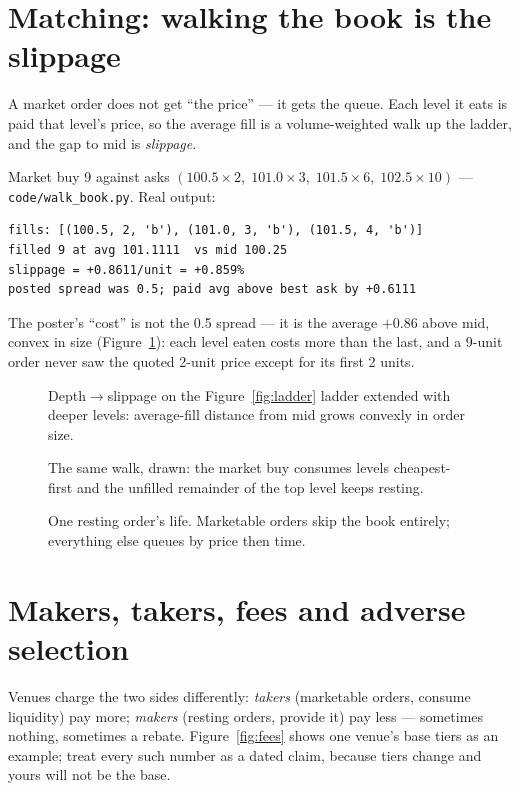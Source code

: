 \section{Matching: walking the book is the slippage}\label{sec:match}
A market order does not get ``the price'' --- it gets the queue.
Each level it eats is paid that level's price, so the average fill
is a volume-weighted walk up the ladder, and the gap to mid is
\emph{slippage}.

\begin{example}\label{ex:walk}
Market buy 9 against asks $(100.5\!\times\!2,\;101.0\!\times\!3,\;
101.5\!\times\!6,\;102.5\!\times\!10)$ ---
\texttt{code/walk\_book.py}. Real output:
\begin{lstlisting}[numbers=none]
fills: [(100.5, 2, 'b'), (101.0, 3, 'b'), (101.5, 4, 'b')]
filled 9 at avg 101.1111  vs mid 100.25
slippage = +0.8611/unit = +0.859%
posted spread was 0.5; paid avg above best ask by +0.6111
\end{lstlisting}
The poster's ``cost'' is not the 0.5 spread --- it is the average
$+0.86$ above mid, convex in size (Figure~\ref{fig:slip}): each
level eaten costs more than the last, and a 9-unit order never saw
the quoted 2-unit price except for its first 2 units.
\end{example}

\begin{figure}[ht]\centering

\caption{Depth$\to$slippage on the Figure~\ref{fig:ladder} ladder
extended with deeper levels: average-fill distance from mid grows
convexly in order size.}
\label{fig:slip}
\end{figure}

\begin{figure}[ht]\centering

\caption{The same walk, drawn: the market buy consumes levels
cheapest-first and the unfilled remainder of the top level keeps
resting.}
\label{fig:walk}
\end{figure}

\begin{figure}[ht]\centering

\caption{One resting order's life. Marketable orders skip the book
entirely; everything else queues by price then time.}
\label{fig:state}
\end{figure}

\section{Makers, takers, fees and adverse selection}\label{sec:makers}
Venues charge the two sides differently: \emph{takers} (marketable
orders, consume liquidity) pay more; \emph{makers} (resting orders,
provide it) pay less --- sometimes nothing, sometimes a rebate.
Figure~\ref{fig:fees} shows one venue's base tiers as an example;
treat every such number as a dated claim, because tiers change and
yours will not be the base.

